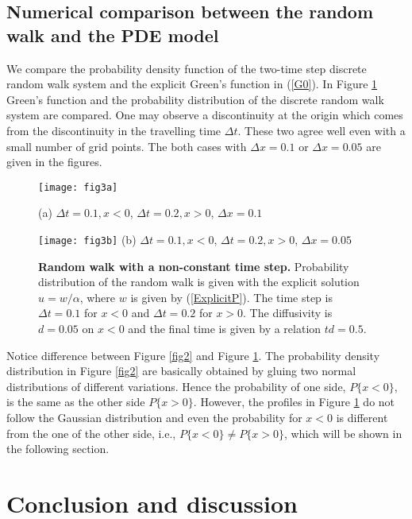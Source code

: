 \documentclass[11pt]{amsart}
\def\d{d}
\begin{document}
\subsection{Numerical comparison between the random walk and the PDE model}

We compare the probability density function of the two-time step discrete random walk system and the explicit Green's function in (\ref{G0}). In Figure \ref{fig3} Green's function and the probability distribution of the discrete random walk system are compared. One may observe a discontinuity at the origin which comes from the discontinuity in the travelling time $\Delta t$. These two agree well even with a small number of grid points. The both cases with $\Delta x=0.1$ or $\Delta x=0.05$ are given in the figures.


\begin{figure}[ht]
\centering
\begin{minipage}[t]{0.49\textwidth}
 \centering
 \texttt{[image: fig3a]}

(a) $\Delta t=0.1, x<0$, $\Delta t=0.2, x>0$, $\Delta x=0.1$
\end{minipage}
\begin{minipage}[t]{0.49\textwidth}
\centering
 \texttt{[image: fig3b]}
(b) $\Delta t=0.1, x<0$, $\Delta t=0.2, x>0$, $\Delta x=0.05$
\end{minipage}
\caption{{\bf Random walk with a non-constant time step.} Probability distribution of the random walk is given with the explicit solution $u=w/\alpha$, where $w$ is given by (\ref{ExplicitP}). The time step is $\Delta t=0.1$ for $x<0$ and  $\Delta t=0.2$ for $x>0$. The diffusivity is $\d=0.05$ on $x<0$ and the final time is given by a relation $t\d=0.5$.} \label{fig3}
\end{figure}
Notice difference between Figure \ref{fig2} and Figure \ref{fig3}. The probability density distribution in Figure \ref{fig2} are basically obtained by gluing two normal distributions of different variations. Hence the probability of one side, $P\{x<0\}$, is the same as the other side $P\{x>0\}$. However, the profiles in Figure \ref{fig3} do not follow the Gaussian distribution and even the probability for $x<0$ is different from the one of the other side, i.e., $P\{x<0\}\ne P\{x>0\}$, which will be shown in the following section.


\section{Conclusion and discussion}
\end{document}
